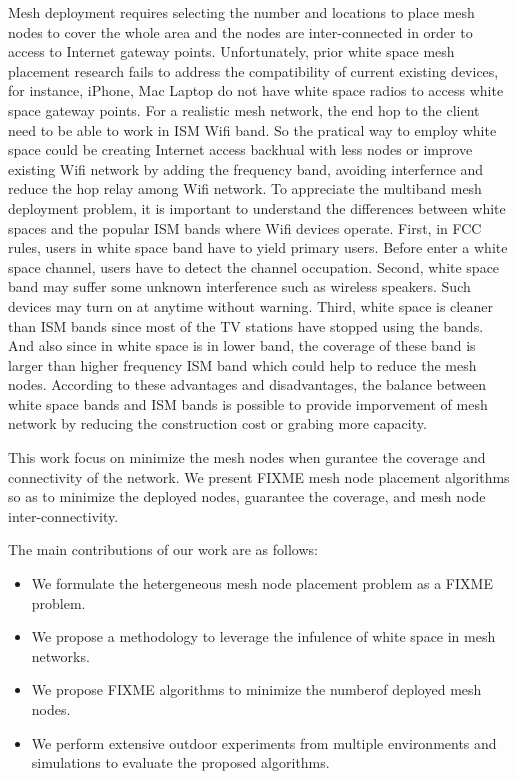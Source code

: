 Mesh deployment requires selecting the number and locations to place mesh nodes to cover the whole area and the nodes are inter-connected in order to access to Internet gateway points.
Unfortunately, prior white space mesh placement research fails to address the compatibility of current existing devices, for instance, iPhone, Mac Laptop do not have white space radios to access white space gateway points. For a realistic mesh network, the end hop to the client need to be able to work in ISM Wifi band. 
So the pratical way to employ white space could be creating Internet access backhual with less nodes or improve existing Wifi network by adding the frequency band, avoiding interfernce and reduce the hop relay among Wifi network.
To appreciate the multiband mesh deployment problem, it is important to understand the differences between white spaces and the popular ISM bands where Wifi devices operate. First, in FCC rules, users in white space band have to yield primary users.
Before enter a white space channel, users have to detect the channel occupation. 
Second, white space band may suffer some unknown interference such as wireless speakers. Such devices may turn on at anytime without warning. 
Third, white space is cleaner than ISM bands since most of the TV stations have stopped using the bands. 
And also since in white space is in lower band, the coverage of these band is larger than higher frequency ISM band which could help to reduce the mesh nodes. 
According to these advantages and disadvantages, the balance between white space bands and ISM bands is possible to provide imporvement of mesh network by reducing the construction cost or grabing more capacity. 



This work focus on minimize the mesh nodes when gurantee the coverage and connectivity of the network.
We present FIXME mesh node placement algorithms so as to minimize the deployed nodes, guarantee the coverage, and mesh node inter-connectivity.


% 

% 
The main contributions of our work are as follows:
\begin{itemize}
\item We formulate the hetergeneous mesh node placement problem as a FIXME problem.  

\item We propose a methodology to leverage the infulence of white space in mesh networks.

\item We propose FIXME algorithms to minimize the numberof deployed mesh nodes.

\item We perform extensive outdoor experiments from multiple environments and simulations to evaluate the proposed algorithms.


\end{itemize}




